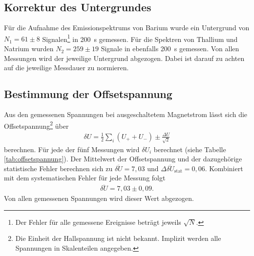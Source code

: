 \subsection{Korrektur des Untergrundes}
Für die Aufnahme des Emissionspektrums von Barium wurde ein Untergrund von $N_1=61\pm 8$ Signalen\footnote{Der Fehler für alle gemessene Ereignisse beträgt jeweils $\sqrt{N}$.} in \SI{200}{\second} gemessen. Für die Spektren von Thallium und Natrium wurden $N_2=259 \pm 19$ Signale in ebenfalls \SI{200}{\second} gemessen. Von allen Messungen wird der jeweilige Untergrund abgezogen. Dabei ist darauf zu achten auf die jeweilige Messdauer zu normieren. 

\subsection{Bestimmung der Offsetspannung}
Aus den gemessenen Spannungen bei ausgeschaltetem Magnetstrom lässt sich die Offsetspannung\footnote{Die Einheit der Hallspannung ist nicht bekannt. Implizit werden alle Spannungen in Skalenteilen angegeben.} über
\begin{align*}
  \delta U=\frac{1}{2}\sum_i (U_++U_-) \pm \frac{\Delta U}{\sqrt{2}}
\end{align*}
berechnen. Für jede der fünf Messungen wird $\delta U_i$ berechnet (siehe Tabelle \ref{tab:offsetspannung}). Der Mittelwert der Offsetspannung und der dazugehörige statistische Fehler berechnen sich zu $\overline{\delta U}=7,03$ und $\Delta \overline{\delta U}_\mathrm{stat}=0,06$. Kombiniert mit dem systematischen Fehler für jede Messung folgt 
\begin{align*}
  \overline{\delta U}=7,03 \pm 0,09.
\end{align*} 
Von allen gemessenen Spannungen wird dieser Wert abgezogen.


